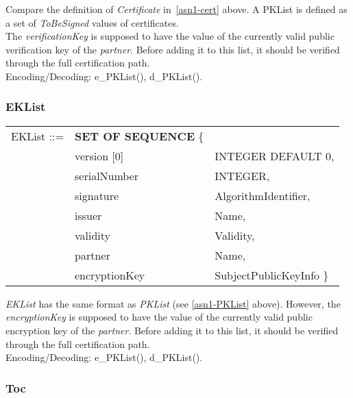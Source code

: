 Compare the definition of {\em Certificate} in~\ref{asn1-cert} above. A PKList is defined
as a set of {\em ToBeSigned} values of certificates. \\ [1ex] 
The {\em verificationKey} is supposed to have the value
of the currently valid public verification key of the {\em partner}.
Before adding it to this list, it should be verified through
the full certification path.
\\[1ex]
Encoding/Decoding: e\_PKList(), d\_PKList().

\subsubsection{EKList}
\label{asn1-EKList}

{\small
\begin {center}
\begin {tabular}{lll}
EKList ::= & {\bf SET OF SEQUENCE} \{ &  \\
 & version [0]     & INTEGER DEFAULT 0,       \\
 & serialNumber    & INTEGER,                 \\
 & signature       & AlgorithmIdentifier,     \\
 & issuer          & Name,                    \\
 & validity        & Validity,                \\
 & partner         & Name,                    \\
 & encryptionKey   & SubjectPublicKeyInfo \}
\end {tabular}
\end {center}
}
 
{\em EKList} has the same format as {\em PKList}
(see \ref{asn1-PKList} above).
However,
the {\em encryptionKey} is supposed to have the value
of the currently valid public encryption key of the {\em partner}.
Before adding it to this list, it should be verified through
the full certification path.
\\[1ex]               

Encoding/Decoding: e\_PKList(), d\_PKList().

\subsubsection{Toc}
\label{asn1-TOC}

